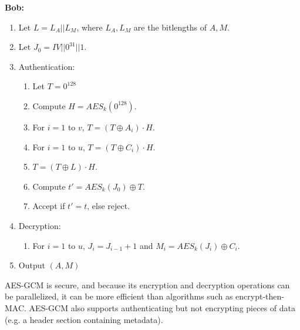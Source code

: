\documentclass[12pt,titlepage]{article}
\begin{document}
        \textbf{Bob:}
        \begin{enumerate}
          \item Let $L = L_A || L_M$, where $L_A, L_M$ are the bitlengths of $A, M$.
          \item Let $J_0 = IV || 0^{31} || 1$.
          \item Authentication:
            \begin{enumerate}
              \item Let $T = 0^{128}$
              \item Compute $H = AES_k(0^{128})$.
              \item For $i = 1$ to $v$, $T = (T \oplus A_i) \cdot H$.
              \item For $i = 1$ to $u$, $T = (T \oplus C_i) \cdot H$.
              \item $T = (T \oplus L) \cdot H$.
              \item Compute $t' = AES_k(J_0) \oplus T$.
              \item Accept if $t' = t$, else reject.
            \end{enumerate}
          \item Decryption:
            \begin{enumerate}
              \item For $i = 1$ to $u$, $J_{i} = J_{i-1} + 1$ and $M_i = AES_{k}(J_i) \oplus C_i$.
            \end{enumerate}
          \item Output $(A, M)$
        \end{enumerate}

        AES-GCM is secure, and because its encryption and decryption operations can be parallelized, it can be more efficient than algorithms such as encrypt-then-MAC. AES-GCM also
        supports authenticating but not encrypting pieces of data (e.g. a header section containing metadata).
\end{document}
